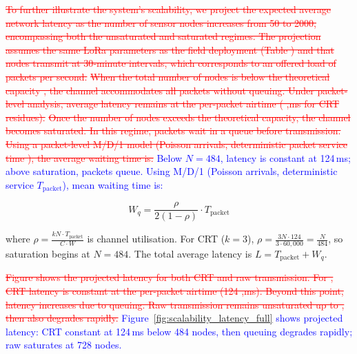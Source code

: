 \documentclass[pdflatex,sn-mathphys-num]{sn-jnl}
\theoremstyle{thmstyleone}
\theoremstyle{thmstyletwo}
\theoremstyle{thmstylethree}
\begin{document}
{\textcolor{red}{\sout{To further illustrate the system's scalability, we project the expected average network latency as the number of sensor nodes increases from 50 to 2000, encompassing both the unsaturated and saturated regimes. The projection assumes the same LoRa parameters as the field deployment (Table ) and that nodes transmit at 30‑minute intervals, which corresponds to an offered load of packets per second.}}
\textcolor{red}{\sout{When the total number of nodes is below the theoretical capacity , the channel accommodates all packets without queuing. Under packet-level analysis, average latency remains at the per-packet airtime ( ,ms for CRT residues).}}
\textcolor{red}{\sout{Once the number of nodes exceeds the theoretical capacity, the channel becomes saturated. In this regime, packets wait in a queue before transmission. Using a packet-level M/D/1 model (Poisson arrivals, deterministic packet service time ), the average waiting time is:}}
\textcolor{blue}{Below $N=484$, latency is constant at 124\,ms; above saturation, packets queue. Using M/D/1 (Poisson arrivals, deterministic service $T_{\text{packet}}$), mean waiting time is:}

\begin{equation}
W_q = \frac{\rho}{2(1-\rho)} \cdot T_{\text{packet}}
\label{eq:latency_model}
\end{equation}

where $\rho = \frac{kN \cdot T_{\text{packet}}}{C \cdot W}$ is channel utilisation. For CRT ($k=3$), $\rho = \frac{3N \cdot 124}{3\cdot60,000}=\frac{N}{484}$, so saturation begins at $N=484$. The total average latency is $L = T_{\text{packet}} + W_q$.

\textcolor{red}{\sout{Figure shows the projected latency for both CRT and raw transmission. For , CRT latency is constant at the per-packet airtime (124 ,ms). Beyond this point, latency increases due to queuing. Raw transmission remains unsaturated up to , then also degrades rapidly.}}
\textcolor{blue}{Figure~\ref{fig:scalability_latency_full} shows projected latency: CRT constant at 124\,ms below 484 nodes, then queuing degrades rapidly; raw saturates at 728 nodes.}

\begin{figure}[!htbp]
\centering
{}
\end{figure}}
\end{document}

